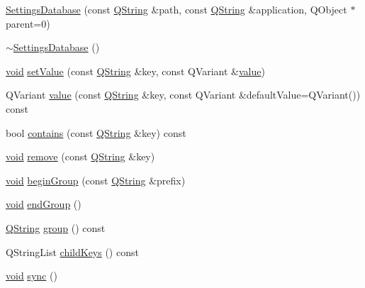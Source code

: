 \begin{DoxyCompactItemize}
\item 
\hyperlink{group___core_plugin_gadfd6819d980e975d9c04d62a1a976854}{\-Settings\-Database} (const \hyperlink{group___u_a_v_objects_plugin_gab9d252f49c333c94a72f97ce3105a32d}{\-Q\-String} \&path, const \hyperlink{group___u_a_v_objects_plugin_gab9d252f49c333c94a72f97ce3105a32d}{\-Q\-String} \&application, \-Q\-Object $\ast$parent=0)
\item 
\hyperlink{group___core_plugin_ga6e94a52341d1acd5855ecafae93bafe1}{$\sim$\-Settings\-Database} ()
\item 
\hyperlink{group___u_a_v_objects_plugin_ga444cf2ff3f0ecbe028adce838d373f5c}{void} \hyperlink{group___core_plugin_ga6421733fa988f0cbf777c9883cf740bf}{set\-Value} (const \hyperlink{group___u_a_v_objects_plugin_gab9d252f49c333c94a72f97ce3105a32d}{\-Q\-String} \&key, const \-Q\-Variant \&\hyperlink{group___core_plugin_ga2403d7e483878cc96312961989a4f313}{value})
\item 
\-Q\-Variant \hyperlink{group___core_plugin_ga2403d7e483878cc96312961989a4f313}{value} (const \hyperlink{group___u_a_v_objects_plugin_gab9d252f49c333c94a72f97ce3105a32d}{\-Q\-String} \&key, const \-Q\-Variant \&default\-Value=\-Q\-Variant()) const 
\item 
bool \hyperlink{group___core_plugin_gaedd7b13a933a752c6a8504cae60b0c14}{contains} (const \hyperlink{group___u_a_v_objects_plugin_gab9d252f49c333c94a72f97ce3105a32d}{\-Q\-String} \&key) const 
\item 
\hyperlink{group___u_a_v_objects_plugin_ga444cf2ff3f0ecbe028adce838d373f5c}{void} \hyperlink{group___core_plugin_gaa8fd610cbfc6d75228f34b6ffebb90f6}{remove} (const \hyperlink{group___u_a_v_objects_plugin_gab9d252f49c333c94a72f97ce3105a32d}{\-Q\-String} \&key)
\item 
\hyperlink{group___u_a_v_objects_plugin_ga444cf2ff3f0ecbe028adce838d373f5c}{void} \hyperlink{group___core_plugin_gacc3d6f9f4d789e95e35d7191270b785e}{begin\-Group} (const \hyperlink{group___u_a_v_objects_plugin_gab9d252f49c333c94a72f97ce3105a32d}{\-Q\-String} \&prefix)
\item 
\hyperlink{group___u_a_v_objects_plugin_ga444cf2ff3f0ecbe028adce838d373f5c}{void} \hyperlink{group___core_plugin_ga25d3e7eec0f9a284ab71b851d89787d8}{end\-Group} ()
\item 
\hyperlink{group___u_a_v_objects_plugin_gab9d252f49c333c94a72f97ce3105a32d}{\-Q\-String} \hyperlink{group___core_plugin_ga30e9f4775fc7a818bbb4222fe8765f39}{group} () const 
\item 
\-Q\-String\-List \hyperlink{group___core_plugin_gac6824b67c3779827e7e190b0ec57cac1}{child\-Keys} () const 
\item 
\hyperlink{group___u_a_v_objects_plugin_ga444cf2ff3f0ecbe028adce838d373f5c}{void} \hyperlink{group___core_plugin_ga812eb28c2f1d174b967b3e5b020f25c5}{sync} ()
\end{DoxyCompactItemize}


